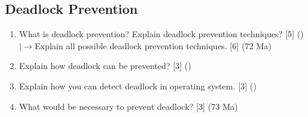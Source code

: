 \documentclass[12pt]{article}
\newcommand{\lb}{\\$\left|\rightarrow\right.$}
\begin{document}
	\subsection{Deadlock Prevention}
		\begin{enumerate}[noitemsep, topsep=0pt]
			\item What is deadlock prevention? Explain deadlock prevention techniques? \hfill [5] ()
			\lb Explain all possible deadlock prevention techniques. \hfill [6] (72 Ma)

			\item Explain how deadlock can be prevented? \hfill [3] ()

			\item Explain how you can detect deadlock in operating system. \hfill [3] ()

			\item  What would be necessary to prevent deadlock? \hfill [3] (73 Ma) 
		\end{enumerate}
\end{document}
